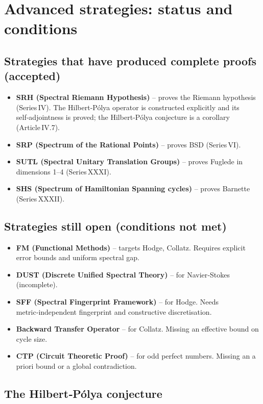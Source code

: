\documentclass[11pt,a4paper]{article}
\begin{document}
\section{Advanced strategies: status and conditions}

\subsection{Strategies that have produced complete proofs (accepted)}

\begin{itemize}
\item \textbf{SRH (Spectral Riemann Hypothesis)} – proves the Riemann hypothesis (Series IV). The Hilbert‑Pólya operator is constructed explicitly and its self‑adjointness is proved; the Hilbert‑Pólya conjecture is a corollary (Article IV.7).
\item \textbf{SRP (Spectrum of the Rational Points)} – proves BSD (Series VI).
\item \textbf{SUTL (Spectral Unitary Translation Groups)} – proves Fuglede in dimensions 1–4 (Series XXXI).
\item \textbf{SHS (Spectrum of Hamiltonian Spanning cycles)} – proves Barnette (Series XXXII).
\end{itemize}

\subsection{Strategies still open (conditions not met)}

\begin{itemize}
\item \textbf{FM (Functional Methods)} – targets Hodge, Collatz. Requires explicit error bounds and uniform spectral gap.
\item \textbf{DUST (Discrete Unified Spectral Theory)} – for Navier‑Stokes (incomplete).
\item \textbf{SFF (Spectral Fingerprint Framework)} – for Hodge. Needs metric‑independent fingerprint and constructive discretisation.
\item \textbf{Backward Transfer Operator} – for Collatz. Missing an effective bound on cycle size.
\item \textbf{CTP (Circuit Theoretic Proof)} – for odd perfect numbers. Missing an a priori bound or a global contradiction.
\end{itemize}

\subsection{The Hilbert‑Pólya conjecture}
\end{document}
